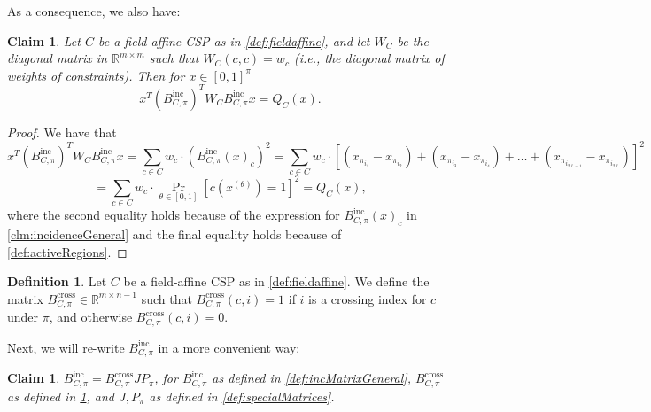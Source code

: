 \documentclass[11pt]{article}
\newtheorem{claim}[theorem]{Claim}
\theoremstyle{definition}
\newtheorem{definition}{Definition}[section]
\newcommand{\R}{\mathbb{R}}
\begin{document}
As a consequence, we also have:

\begin{claim}\label{clm:quadraticEquivalenceGeneral}
	Let $C$ be a field-affine CSP as in \cref{def:fieldaffine}, and let $W_C$ be the diagonal matrix in $\R^{m \times m}$ such that $W_C(c, c) = w_c$ (i.e., the diagonal matrix of weights of constraints). Then for $x \in [0,1]^{\pi}$
	\[
	x^T (B^{\text{inc}}_{C, \pi})^T W_C B^{\text{inc}}_{C, \pi} x = Q_C(x).
	\]
\end{claim}

\begin{proof}
	We have that 
	\[
	x^T (B^{\text{inc}}_{C, \pi})^T W_C B^{\text{inc}}_{C, \pi} x = \sum_{c \in C} w_c \cdot (B^{\text{inc}}_{C, \pi}(x)_c)^2 = \sum_{c \in C} w_c \cdot [(x_{\pi_{i_1}} - x_{\pi_{i_2}}) + (x_{\pi_{i_3}} - x_{\pi_{i_4}}) + \dots + (x_{\pi_{i_{2\ell -1}}} - x_{\pi_{i_{2\ell}}})]^2
	\]
    \[
    = \sum_{c \in C} w_c \cdot \Pr_{\theta \in [0,1]}[c(x^{(\theta)}) = 1]^2 = Q_C(x),
    \]
	where the second equality holds because of the expression for $B^{\text{inc}}_{C, \pi}(x)_c$ in \cref{clm:incidenceGeneral} and the final equality holds because of \cref{def:activeRegions}.
\end{proof}


\begin{definition}\label{def:crossMatrixfield}
    Let $C$ be a field-affine CSP as in \cref{def:fieldaffine}. We define the matrix $B^{\text{cross}}_{C, \pi} \in \R^{m \times n-1}$ such that $B^{\text{cross}}_{C, \pi}(c, i) = 1$ if $i$ is a crossing index for $c$ under $\pi$, and otherwise $B^{\text{cross}}_{C, \pi}(c, i) = 0$.
\end{definition}

Next, we will re-write $B^{\text{inc}}_{C, \pi}$ in a more convenient way:

\begin{claim}\label{clm:convenientRepfield}
	$B^{\text{inc}}_{C, \pi} = B^{\text{cross}}_{C, \pi} J P_{\pi}$, for $B^{\text{inc}}_{C, \pi}$ as defined in \cref{def:incMatrixGeneral}, $B^{\text{cross}}_{C, \pi}$ as defined in \cref{def:crossMatrixfield}, and $J, P_{\pi}$ as defined in \cref{def:specialMatrices}.
\end{claim}
\end{document}
